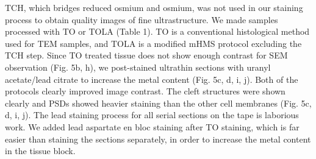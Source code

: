 \documentclass{article}
\begin{document}
TCH, which bridges reduced osmium and osmium, was not used in our staining process to obtain quality images of fine ultrastructure. We made samples processed with TO or TOLA (Table 1). TO is a conventional histological method used for TEM samples, and TOLA is a modified mHMS protocol excluding the TCH step. Since TO treated tissue does not show enough contrast for SEM observation (Fig. 5b, h), we post-stained ultrathin sections with uranyl acetate/lead citrate to increase the metal content (Fig. 5c, d, i, j). Both of the protocols clearly improved image contrast. The cleft structures were shown clearly and PSDs showed heavier staining than the other cell membranes (Fig. 5c, d, i, j). The lead staining process for all serial sections on the tape 
is laborious work. We added lead aspartate en bloc staining after TO staining, which is far easier than staining the sections separately, in order to increase the metal content in the tissue block.
\end{document}
